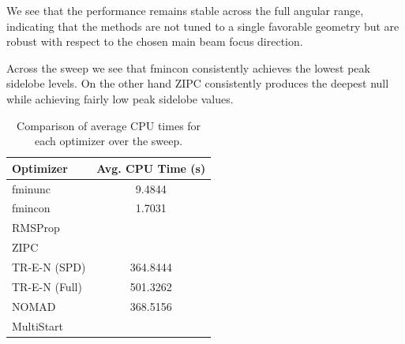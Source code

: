 \documentclass[11pt,letterpaper]{article}
\theoremstyle{definition}
\theoremstyle{plain}
\begin{document}
We see that the performance remains stable across the full angular range, indicating that the methods are not tuned to a single favorable geometry but are robust with respect to the chosen main beam focus direction.

Across the sweep we see that fmincon consistently achieves the lowest peak sidelobe levels. On the other hand ZIPC consistently produces the deepest null while achieving fairly low peak sidelobe values.


\begin{table}[htpb]
    \centering
    \caption{Comparison of average CPU times for each optimizer over the sweep.}
    \label{tab:optimizer_times}
    \begin{tabular}{lc}
        \toprule
        \textbf{Optimizer} & \textbf{Avg. CPU Time (s)} \\
        \midrule
        fminunc & 9.4844 \\
        fmincon & 1.7031 \\
        RMSProp &  \\
        ZIPC &  \\
        TR-E-N (SPD) &  364.8444\\
        TR-E-N (Full) &  501.3262\\
        NOMAD &  368.5156\\
        MultiStart &  \\
        \bottomrule
    \end{tabular}
\end{table}
\end{document}
